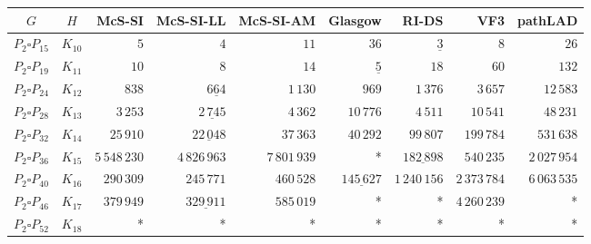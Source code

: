 
\begin{tabular}{ccrrrrrrr}
    \toprule
    {$G$} & {$H$} & {McS-SI} & {McS-SI-LL} & {McS-SI-AM} & Glasgow & RI-DS & VF3 & pathLAD \\ 
    \midrule

$P_2\square P_{15}$ & $K_{10}$ & $5$ & $4$ & $11$ & $36$ & $\underline{3}$ & $8$ & $26$\\
$P_2\square P_{19}$ & $K_{11}$ & $10$ & $8$ & $14$ & $\underline{5}$ & $18$ & $60$ & $132$\\
$P_2\square P_{24}$ & $K_{12}$ & $838$ & $\underline{664}$ & $1\,130$ & $969$ & $1\,376$ & $3\,657$ & $12\,583$\\
$P_2\square P_{28}$ & $K_{13}$ & $3\,253$ & $\underline{2\,745}$ & $4\,362$ & $10\,776$ & $4\,511$ & $10\,541$ & $48\,231$\\
$P_2\square P_{32}$ & $K_{14}$ & $25\,910$ & $\underline{22\,048}$ & $37\,363$ & $40\,292$ & $99\,807$ & $199\,784$ & $531\,638$\\
$P_2\square P_{36}$ & $K_{15}$ & $5\,548\,230$ & $4\,826\,963$ & $7\,801\,939$ & * & $\underline{182\,898}$ & $540\,235$ & $2\,027\,954$\\
$P_2\square P_{40}$ & $K_{16}$ & $290\,309$ & $245\,771$ & $460\,528$ & $\underline{145\,627}$ & $1\,240\,156$ & $2\,373\,784$ & $6\,063\,535$\\
$P_2\square P_{46}$ & $K_{17}$ & $379\,949$ & $\underline{329\,911}$ & $585\,019$ & * & * & $4\,260\,239$ & *\\
$P_2\square P_{52}$ & $K_{18}$ & * & * & * & * & * & * & *\\

    \bottomrule
\end{tabular}

